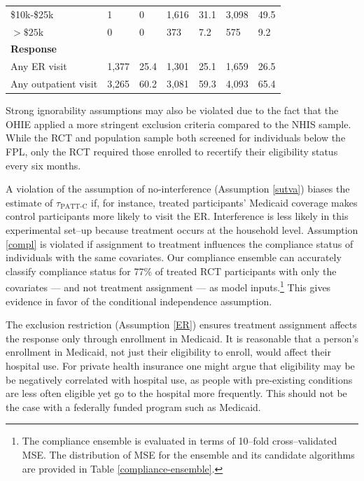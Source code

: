 \documentclass[hidelinks,12pt]{article}
\begin{document}
{\begin{singlespace}
\begin{longtable}{lllllll}
\hspace{3mm} \$10k-\$25k & 1 & 0 & 1,616 & 31.1 & 3,098 & 49.5 \\

\hspace{3mm} $>\$25$k & 0 & 0 & 373 & 7.2 & 575 & 9.2  \\
   \hline
\hline
 \textbf{Response} &   &  &  & &  &  \\ 
\hspace{3mm}Any ER visit &  1,377 & 25.4 & 1,301 & 25.1 & 1,659 & 26.5  \\ 
\hspace{3mm}Any outpatient visit & 3,265 & 60.2 & 3,081 & 59.3 & 4,093 & 65.4 \\ 
\hline
\hline
\end{longtable}
\end{singlespace}
\restoregeometry

{\color{red}Strong ignorability assumptions may also be violated due to the fact that the OHIE applied a more stringent exclusion criteria compared to the NHIS sample. While the RCT and population sample both screened for individuals below the FPL, only the RCT required those enrolled to recertify their eligibility status every six months.}

A violation of the assumption of no-interference (Assumption \ref{sutva}) biases the estimate of $\tau_{\text{PATT-C}}$ if, for instance, treated participants' Medicaid coverage makes control participants more likely to visit the ER. Interference is less likely in this experimental set--up because treatment occurs at the household level. Assumption \ref{compl} is violated if assignment to treatment influences the compliance status of individuals with the same covariates. Our compliance ensemble can accurately classify compliance status for 77\% of treated RCT participants with only the covariates --- and not treatment assignment --- as model inputs.\footnote{{\color{red}The compliance ensemble is evaluated in terms of 10--fold cross--validated MSE. The distribution of MSE for the ensemble and its candidate algorithms are provided in Table \ref{compliance-ensemble}.}}  This gives evidence in favor of the conditional independence assumption.

The exclusion restriction (Assumption \ref{ER}) ensures treatment assignment affects the response only through enrollment in Medicaid. It is reasonable that a person's enrollment in Medicaid, not just their eligibility to enroll, would affect their hospital use. For private health insurance one might argue that eligibility may be be negatively correlated with hospital use, as people with pre-existing conditions are less often eligible yet go to the hospital more frequently. This should not be the case with a federally funded program such as Medicaid. 

}
\end{document}
